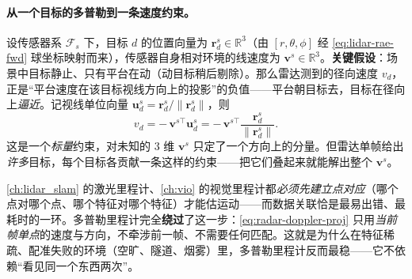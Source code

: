 \paragraph{从一个目标的多普勒到一条速度约束。}
设传感器系 $\mathcal F_s$ 下，目标 $d$ 的位置向量为 $\mathbf r_d^s\in\mathbb R^3$（由 $[r,\theta,\phi]$ 经 \cref{eq:lidar-rae-fwd} 球坐标映射而来），传感器自身相对环境的线速度为 $\mathbf v^s\in\mathbb R^3$。\textbf{关键假设}：场景中目标静止、只有平台在动（动目标稍后剔除）。那么雷达测到的径向速度 $v_d$，正是“平台速度在该目标视线方向上的投影”的负值——平台朝目标去，目标在径向上\emph{逼近}。记视线单位向量 $\mathbf u_d^s=\mathbf r_d^s/\|\mathbf r_d^s\|$，则
\begin{equation}
  v_d=-\,\mathbf v^{s\top}\mathbf u_d^s
   =-\,\mathbf v^{s\top}\frac{\mathbf r_d^s}{\|\mathbf r_d^s\|}.
  \label{eq:radar-doppler-proj}
\end{equation}
这是一个\emph{标量}约束，对未知的 $3$ 维 $\mathbf v^s$ 只定了一个方向上的分量。但雷达单帧给出\emph{许多}目标，每个目标各贡献一条这样的约束——把它们叠起来就能解出整个 $\mathbf v^s$。

\begin{insight}\label{ins:radar-corr-free}
\cref{ch:lidar_slam} 的激光里程计、\cref{ch:vio} 的视觉里程计都\emph{必须先建立点对应}（哪个点对哪个点、哪个特征对哪个特征）才能估运动——而数据关联恰是最易出错、最耗时的一环。多普勒里程计完全\textbf{绕过}了这一步：\cref{eq:radar-doppler-proj} 只用\emph{当前帧单点}的速度与方向，不牵涉前一帧、不需要任何匹配。这就是为什么在特征稀疏、配准失败的环境（空旷、隧道、烟雾）里，多普勒里程计反而最稳——它不依赖“看见同一个东西两次”。
\end{insight}

